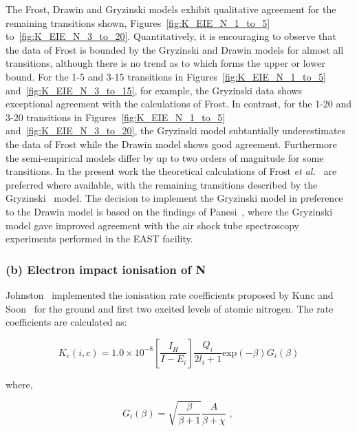 {\par

The Frost, Drawin and Gryzinski models exhibit qualitative agreement for the remaining transitions shown, Figures~\ref{fig:K_EIE_N_1_to_5} to~\ref{fig:K_EIE_N_3_to_20}.
Quantitatively, it is encouraging to observe that the data of Frost is bounded by the Gryzinski and Drawin models for almost all transitions, although there is no trend as to which forms the upper or lower bound.
For the 1-5 and 3-15 transitions in Figures~\ref{fig:K_EIE_N_1_to_5} and~\ref{fig:K_EIE_N_3_to_15}, for example, the Gryzinski data shows exceptional agreement with the calculations of Frost.
In contrast, for the 1-20 and 3-20 transitions in Figures~\ref{fig:K_EIE_N_1_to_5} and~\ref{fig:K_EIE_N_3_to_20}, the Gryzinski model subtantially underestimates the data of Frost while the Drawin model shows good agreement.
Furthermore the semi-empirical models differ by up to two orders of magnitude for some transitions.
In the present work the theoretical calculations of Frost \textit{et al.}~\cite{FAS+1998} are preferred where available, with the remaining transitions described by the Gryzinski~\cite{Gryz59} model.
The decision to implement the Gryzinski model in preference to the Drawin model is based on the findings of Panesi~\cite{panesi_2008B,panesi_phd}, where the Gryzinski model gave improved agreement with the air shock tube spectroscopy experiments performed in the EAST facility.

\subsubsection{(b) Electron impact ionisation of N}

Johnston~\cite{JohnPhd} implemented the ionisation rate coefficients proposed by Kunc and Soon~\cite{KS1989} for the ground and first two excited levels of atomic nitrogen.
The rate coefficients are calculated as:

\begin{equation}
 K_e(i,c) = 1.0 \times 10^{-8} \left [ \frac{I_H}{I - E_i} \right ] \frac{Q_i}{2 l_i + 1} \text{exp} \left ( - \beta \right ) G_i \left ( \beta \right ) \label{eq:K_EII_Soon_Kunc_a}
\end{equation}

\noindent where,

\begin{equation}
 G_i ( \beta ) = \sqrt{\frac{\beta}{\beta+1}} \frac{A}{\beta + \chi} \text{ , }
\end{equation}

}
